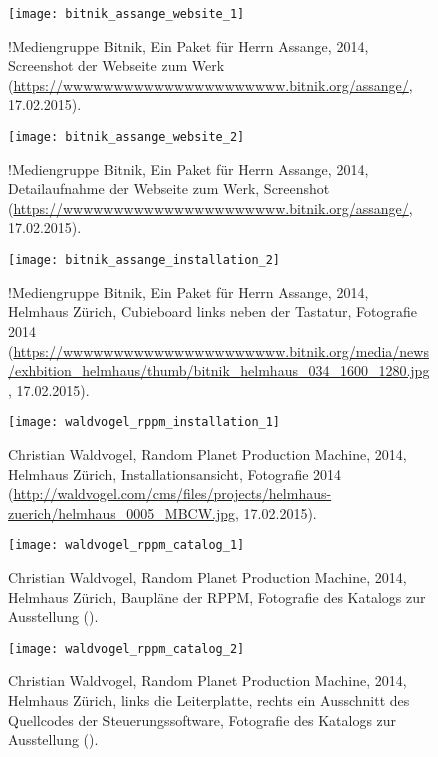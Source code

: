 \documentclass[
paper=164mm:234mm, %
pagesize, %
DIV=calc, %
10pt, %
BCOR=0mm, %
parskip=half- %
]{scrbook}
\begin{document}
\begin{figure}[H]
	\centering
	\texttt{[image: bitnik\_assange\_website\_1]}
	\caption{!Mediengruppe Bitnik, Ein Paket für Herrn Assange, 2014, Screenshot der Webseite zum Werk  (\url{https://wwwwwwwwwwwwwwwwwwwwww.bitnik.org/assange/}, 17.02.2015).}
	\label{fig:bitnik_assange_Webseite_1}
\end{figure}

\begin{figure}[H]
	\centering
	\texttt{[image: bitnik\_assange\_website\_2]}
	\caption{!Mediengruppe Bitnik, Ein Paket für Herrn Assange, 2014, Detailaufnahme der Webseite zum Werk, Screenshot (\url{https://wwwwwwwwwwwwwwwwwwwwww.bitnik.org/assange/}, 17.02.2015).}
	\label{fig:bitnik_assange_Webseite_2}
\end{figure}

\begin{figure}[H]
	\centering
	\texttt{[image: bitnik\_assange\_installation\_2]}
	\caption{!Mediengruppe Bitnik, Ein Paket für Herrn Assange, 2014, Helmhaus Zürich, Cubieboard links neben der Tastatur, Fotografie 2014 (\url{https://wwwwwwwwwwwwwwwwwwwwww.bitnik.org/media/news/exhbition_helmhaus/thumb/bitnik_helmhaus_034_1600_1280.jpg}, 17.02.2015).}
	\label{fig:bitnik_assange_installation_2}
\end{figure}


\begin{figure}[H]
	\centering
	\texttt{[image: waldvogel\_rppm\_installation\_1]}
	\caption{Christian Waldvogel, Random Planet Production Machine, 2014, Helmhaus Zürich, Installationsansicht, Fotografie 2014 (\url{http://waldvogel.com/cms/files/projects/helmhaus-zuerich/helmhaus_0005_MBCW.jpg}, 17.02.2015).}
	\label{fig:waldvogel_rppm_installation_1}
\end{figure}

\begin{figure}[H]
	\centering
	\texttt{[image: waldvogel\_rppm\_catalog\_1]}
	\caption{Christian Waldvogel, Random Planet Production Machine, 2014, Helmhaus Zürich, Baupläne der RPPM, Fotografie des Katalogs zur Ausstellung (\cite[20-21]{Waldvogel:2014}).}
	\label{fig:waldvogel_rppm_catalog_1}
\end{figure}

\begin{figure}[H]
	\centering
	\texttt{[image: waldvogel\_rppm\_catalog\_2]}
	\caption{Christian Waldvogel, Random Planet Production Machine, 2014, Helmhaus Zürich, links die Leiterplatte, rechts ein Ausschnitt des Quellcodes der Steuerungssoftware, Fotografie des Katalogs zur Ausstellung (\cite[26-27]{Waldvogel:2014}).}
	\label{fig:waldvogel_rppm_catalog_2}
\end{figure}
\end{document}
